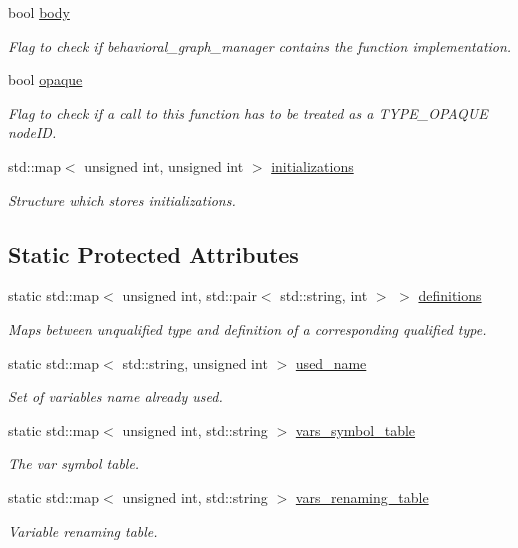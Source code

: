\begin{DoxyCompactItemize}
bool \hyperlink{classBehavioralHelper_a6692a8e5606563e9a6f7a021f91b53aa}{body}
\begin{DoxyCompactList}\small\item\em Flag to check if behavioral\+\_\+graph\+\_\+manager contains the function implementation. \end{DoxyCompactList}\item 
bool \hyperlink{classBehavioralHelper_a613cef19f77ca26c45a46fe3119bf1c5}{opaque}
\begin{DoxyCompactList}\small\item\em Flag to check if a call to this function has to be treated as a T\+Y\+P\+E\+\_\+\+O\+P\+A\+Q\+UE node\+ID. \end{DoxyCompactList}\item 
std\+::map$<$ unsigned int, unsigned int $>$ \hyperlink{classBehavioralHelper_a3cf8a4fb0c7b1299b1fad86600afc50e}{initializations}
\begin{DoxyCompactList}\small\item\em Structure which stores initializations. \end{DoxyCompactList}\end{DoxyCompactItemize}
\subsection*{Static Protected Attributes}
\begin{DoxyCompactItemize}
\item 
static std\+::map$<$ unsigned int, std\+::pair$<$ std\+::string, int $>$ $>$ \hyperlink{classBehavioralHelper_a9180439a07ab5967f36165831d9b626c}{definitions}
\begin{DoxyCompactList}\small\item\em Maps between unqualified type and definition of a corresponding qualified type. \end{DoxyCompactList}\item 
static std\+::map$<$ std\+::string, unsigned int $>$ \hyperlink{classBehavioralHelper_aad28b106f7c6e672da00f2530dd0b48c}{used\+\_\+name}
\begin{DoxyCompactList}\small\item\em Set of variables name already used. \end{DoxyCompactList}\item 
static std\+::map$<$ unsigned int, std\+::string $>$ \hyperlink{classBehavioralHelper_a60d18de9e876b3d89aa2b0be9b5d8d97}{vars\+\_\+symbol\+\_\+table}
\begin{DoxyCompactList}\small\item\em The var symbol table. \end{DoxyCompactList}\item 
static std\+::map$<$ unsigned int, std\+::string $>$ \hyperlink{classBehavioralHelper_a40105f6e1e485144749342e449dbce6a}{vars\+\_\+renaming\+\_\+table}
\begin{DoxyCompactList}\small\item\em Variable renaming table. \end{DoxyCompactList}\end{DoxyCompactItemize}


